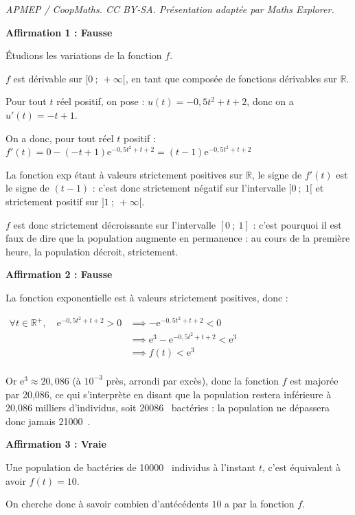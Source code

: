 \documentclass[10pt]{article}
\providecommand{\R}{\mathbb{R}}
\providecommand{\e}{{\mathrm{e}}}
\providecommand{\np}[2][]{{#2~#1}}
\begin{document}
\noindent\textit{APMEP / CoopMaths. CC BY-SA. Présentation adaptée par Maths Explorer.}\par\medskip
\bigskip

\textbf{Affirmation 1 : Fausse}

Étudions les variations de la fonction $f$.

$f$ est dérivable sur $ [0~;~+\infty[ $, en tant que composée de fonctions dérivables sur $\R$.

Pour tout $t$ réel positif, on pose : $u(t) = -0,5t^2 + t+2$, donc on a $u'(t) = -t + 1$.

On a donc, pour tout réel $t$ positif : $f'(t) = 0 - (-t + 1)\e^{-0,5t^2 + t + 2} = (t-1)\e^{-0,5t^2 + t + 2} $

La fonction exp étant à valeurs strictement positives sur $\R$, le signe de $f'(t)$ est le signe de $(t-1)$ : c'est donc strictement négatif sur l'intervalle $ [0~;~1[ $ et strictement positif sur $ ]1~;~+\infty[ $.

$f$ est donc strictement décroissante sur l'intervalle $[ 0~;~1]$ : c'est pourquoi il est faux de dire que la population augmente en permanence : au cours de la première heure, la population décroit, strictement.

\medskip
\textbf{Affirmation 2 : Fausse}

La fonction exponentielle est à valeurs strictement positives, donc :

$\begin{aligned} \forall t \in \R^+, \quad \e^{-0,5t^2 + t + 2} > 0 &\implies -\e^{-0,5t^2 + t + 2}<0\\
&\implies \e^3-\e^{-0,5t^2 + t + 2}<\e^3\\
&\implies f(t) < \e^3\\ \end{aligned}$

Or $\e^3 \approx 20,086$ (à $ 10^{-3} $ près, arrondi par excès), donc la fonction $f$ est majorée par 20,086, ce qui s'interprète en disant que la population restera inférieure à 20,086 milliers d'individus, soit \np{20086} bactéries : la population ne dépassera donc jamais \np{21000}.

\medskip

\textbf{Affirmation 3 : Vraie}

Une population de bactéries de \np{10000} individus à l'instant $t$, c'est équivalent à avoir $f(t) = 10$.

On cherche donc à savoir combien d'antécédents $10$ a par la fonction $f$.
\end{document}
